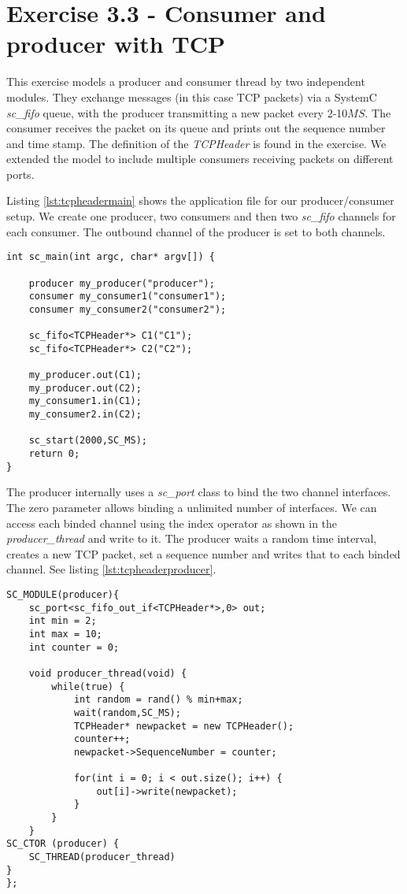 \section{Exercise 3.3 - Consumer and producer with TCP}

This exercise models a producer and consumer thread by two independent modules. They exchange messages (in this case TCP packets) via a SystemC \textit{sc\_fifo} queue, with the producer transmitting a new packet every 2-10$MS$. The consumer receives the packet on its queue and prints out the sequence number and time stamp. The definition of the \textit{TCPHeader} is found in the exercise. We extended the model to include multiple consumers receiving packets on different ports.

\noindent Listing \ref{lst:tcpheadermain} shows the application file for our producer/consumer setup. We create one producer, two consumers and then two \textit{sc\_fifo} channels for each consumer. The outbound channel of the producer is set to both channels.

\begin{lstlisting}[style=customc++, caption=Application file for producer/consumer.,
label={lst:tcpheadermain}]
int sc_main(int argc, char* argv[]) {

	producer my_producer("producer");
	consumer my_consumer1("consumer1");
	consumer my_consumer2("consumer2");

	sc_fifo<TCPHeader*> C1("C1");
	sc_fifo<TCPHeader*> C2("C2");

	my_producer.out(C1);
	my_producer.out(C2);
	my_consumer1.in(C1);
	my_consumer2.in(C2);

	sc_start(2000,SC_MS);
	return 0;
}
\end{lstlisting}
\newpage
\noindent The producer internally uses a \textit{sc\_port} class to bind the two channel interfaces. The zero parameter allows binding a unlimited number of interfaces. We can access each binded channel using the index operator as shown in the \textit{producer\_thread} and write to it. The producer waits a random time interval, creates a new TCP packet, set a sequence number and writes that to each binded channel. See listing \ref{lst:tcpheaderproducer}.

\begin{lstlisting}[style=customc++, caption=Implementation of TCP producer.,
label={lst:tcpheaderproducer}]
SC_MODULE(producer){
	sc_port<sc_fifo_out_if<TCPHeader*>,0> out;
	int min = 2;
	int max = 10;
	int counter = 0;

	void producer_thread(void) {
		while(true) {
			int random = rand() % min+max;
			wait(random,SC_MS);
			TCPHeader* newpacket = new TCPHeader();
			counter++;
			newpacket->SequenceNumber = counter;

			for(int i = 0; i < out.size(); i++) {
				out[i]->write(newpacket);
			}
		}
	}
SC_CTOR (producer) {
	SC_THREAD(producer_thread)
}
};
\end{lstlisting}

